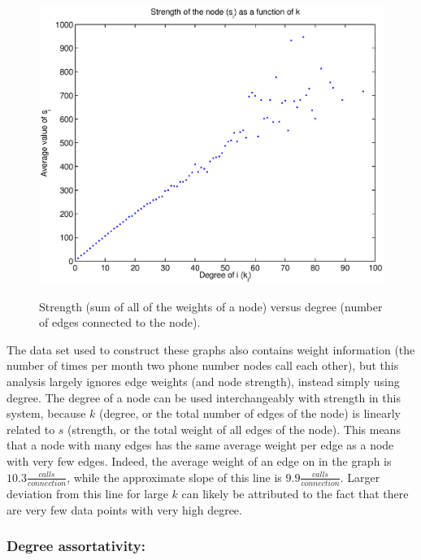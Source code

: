 \documentclass[12pt]{article}
\begin{document}
\begin{figure}[H]
\includegraphics[trim = 0cm 0cm 0cm 0cm, width = .9\textwidth]{Graficos/svsk.eps}
\label{fig:svsk}
\caption{Strength (sum of all of the weights of a node) versus degree (number of edges connected to the node).}
\end{figure}

The data set used to construct these graphs also contains weight information (the number of times per month two phone number nodes call each other), but this analysis largely ignores edge weights (and node strength), instead simply using degree. The degree of a node can be used interchangeably with strength in this system, because \(k\) (degree, or the total number of edges of the node) is linearly related to \(s\) (strength, or the total weight of all edges of the node). This means that a node with many edges has the same average weight per edge as a node with very few edges. Indeed, the average weight of an edge on in the graph is \(10.3 \frac{calls}{connection}\), while the approximate slope of this line is \(9.9  \frac{calls}{connection}\). Larger deviation from this line for large \(k\) can likely be attributed to the fact that there are very few data points with very high degree.

\subsubsection*{Degree assortativity:}

\end{document}
